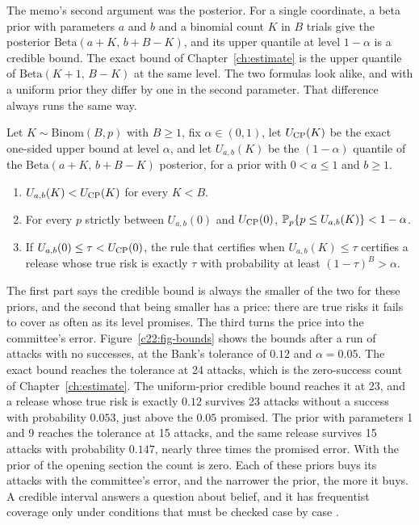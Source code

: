 The memo's second argument was the posterior. For a single coordinate, a beta prior with
parameters $a$ and $b$ and a binomial count $K$ in $B$ trials give the posterior
$\mathrm{Beta}(a+K,\,b+B-K)$, and its upper quantile at level $1-\alpha$ is a credible bound. The exact
bound of Chapter~\ref{ch:estimate} \citep{clopper1934} is the upper quantile of $\mathrm{Beta}(K+1,\,B-K)$ at the same level. The two
formulas look alike, and with a uniform prior they differ by one in the second parameter. That
difference always runs the same way.

\begin{proposition}\label{c22:prop-credible}
Let $K\sim\mathrm{Binom}(B,p)$ with $B\ge1$, fix $\alpha\in(0,1)$, let $U_{\rm CP}(K)$ be the exact one-sided upper bound at level $\alpha$,
and let $U_{a,b}(K)$ be the $(1-\alpha)$ quantile of the $\mathrm{Beta}(a+K,\,b+B-K)$ posterior, for a prior with $0<a\le1$
and $b\ge1$.
\begin{enumerate}
\item $U_{a,b}(K)<U_{\rm CP}(K)$ for every $K<B$.
\item For every $p$ strictly between $U_{a,b}(0)$ and $U_{\rm CP}(0)$, $\mathbb{P}_p\{p\le U_{a,b}(K)\}<1-\alpha$.
\item If $U_{a,b}(0)\le\tau<U_{\rm CP}(0)$, the rule that certifies when $U_{a,b}(K)\le\tau$ certifies a release whose true risk is exactly $\tau$ with probability at least $(1-\tau)^B>\alpha$.
\end{enumerate}
\end{proposition}

The first part says the credible bound is always the smaller of the two for these priors, and the
second that being smaller has a price: there are true risks it fails to cover as often as its
level promises. The third turns the price into the committee's error. Figure~\ref{c22:fig-bounds} shows the
bounds after a run of attacks with no successes, at the Bank's tolerance of $0.12$ and $\alpha=0.05$.
The exact bound reaches the tolerance at 24 attacks, which is the zero-success count of
Chapter~\ref{ch:estimate}. The uniform-prior credible bound reaches it at 23, and a release whose true risk is exactly
$0.12$ survives 23 attacks without a success with probability $0.053$, just above the $0.05$ promised.
The prior with parameters 1 and 9 reaches the tolerance at 15 attacks, and the same release
survives 15 attacks with probability $0.147$, nearly three times the promised error. With the prior
of the opening section the count is zero. Each of these priors buys its attacks with the
committee's error, and the narrower the prior, the more it buys. A credible interval answers a
question about belief, and it has frequentist coverage only under conditions that must be checked
case by case \citep{bayarri2004}.

